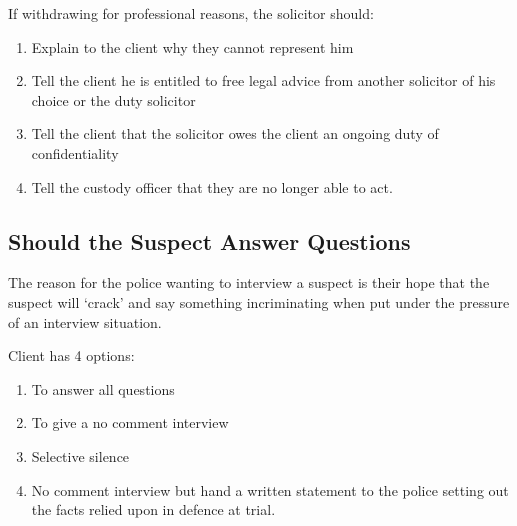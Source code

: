 \documentclass[
]{article}
\providecommand{\tightlist}{%
  \setlength{\itemsep}{0pt}\setlength{\parskip}{0pt}}
\begin{document}
If withdrawing for professional reasons, the solicitor should:

\begin{enumerate}
\def\labelenumi{\arabic{enumi}.}
\tightlist
\item
  Explain to the client why they cannot represent him
\item
  Tell the client he is entitled to free legal advice from another
  solicitor of his choice or the duty solicitor
\item
  Tell the client that the solicitor owes the client an ongoing duty of
  confidentiality
\item
  Tell the custody officer that they are no longer able to act.
\end{enumerate}

\hypertarget{should-the-suspect-answer-questions}{%
\subsection{Should the Suspect Answer
Questions}\label{should-the-suspect-answer-questions}}

The reason for the police wanting to interview a suspect is their hope
that the suspect will `crack' and say something incriminating when put
under the pressure of an interview situation.

Client has 4 options:

\begin{enumerate}
\def\labelenumi{\arabic{enumi}.}
\tightlist
\item
  To answer all questions
\item
  To give a no comment interview
\item
  Selective silence
\item
  No comment interview but hand a written statement to the police
  setting out the facts relied upon in defence at trial.
\end{enumerate}
\end{document}
